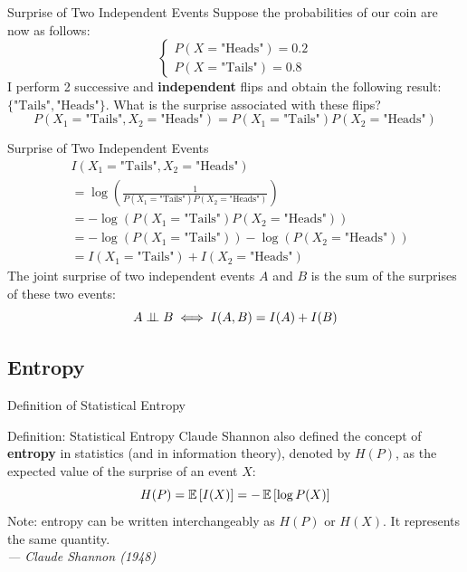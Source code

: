 \begin{frame}{Surprise of Two Independent Events}
	Suppose the probabilities of our coin are now as follows:
	\begin{equation*}
		\begin{cases}
			P(X = \text{"Heads"}) = 0.2 \\
			P(X = \text{"Tails"}) = 0.8
		\end{cases}
	\end{equation*}
	\pause
	I perform 2 successive and \textbf{independent} flips and obtain the following result: $\{\text{"Tails"}, \text{"Heads"}\}$. What is the surprise associated with these flips?
	\begin{equation*}
		P(X_1 = \text{"Tails"}, X_2 = \text{"Heads"}) = P(X_1 = \text{"Tails"}) P(X_2 = \text{"Heads"})
	\end{equation*}
\end{frame}

\begin{frame}{Surprise of Two Independent Events}
	\begin{equation*}
		\begin{aligned}
			&I(X_1 = \text{"Tails"}, X_2 = \text{"Heads"}) \\
			&= \log{\left(\frac{1}{P(X_1 = \text{"Tails"}) P(X_2 = \text{"Heads"})}\right)} \\
			&= - \log{\left(P(X_1 = \text{"Tails"}) P(X_2 = \text{"Heads"})\right)} \\
			&= - \log{\left(P(X_1 = \text{"Tails"})\right)} - \log{\left(P(X_2 = \text{"Heads"})\right)} \\
			&= I(X_1 = \text{"Tails"}) + I(X_2 = \text{"Heads"})
		\end{aligned}
	\end{equation*}
	\pause
	The joint surprise of two independent events $A$ and $B$ is the sum of the surprises of these two events:
	\begin{equation*}
		A \perp\!\!\!\perp B \iff I(A, B) = I(A) + I(B)
	\end{equation*}
\end{frame}

\subsection[Entropy]{Entropy}

\begin{frame}{Definition of Statistical Entropy}
	\begin{block}{Definition: Statistical Entropy}
		Claude Shannon also defined the concept of \textbf{entropy} in statistics (and in information theory), denoted by $H(P)$, as the expected value of the surprise of an event $X$:
		\begin{equation*}
			H(P) = \operatorname{\mathbb{E}}\left[I(X)\right] = - \operatorname{\mathbb{E}}\left[\log{P(X)}\right]
		\end{equation*}
		Note: entropy can be written interchangeably as $H(P)$ or $H(X)$. It represents the same quantity. \\
		\vspace{0.3cm}
		\hfill
		\textit{--- Claude Shannon (1948)}
	\end{block}
\end{frame}

